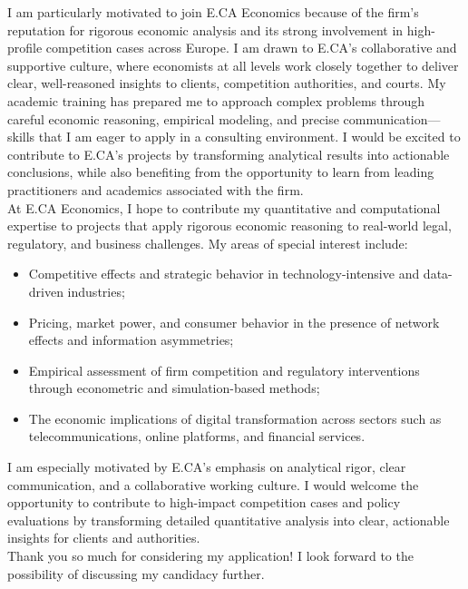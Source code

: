 \documentclass{nfr}
\begin{document}
I am particularly motivated to join E.CA Economics because of the firm’s reputation for rigorous economic analysis and its strong involvement in high-profile competition cases across Europe. 
I am drawn to E.CA’s collaborative and supportive culture, where economists at all levels work closely together to deliver clear, well-reasoned insights to clients, competition authorities, and courts. 
My academic training has prepared me to approach complex problems through careful economic reasoning, empirical modeling, and precise communication—skills that I am eager to apply in a consulting environment. 
I would be excited to contribute to E.CA’s projects by transforming analytical results into actionable conclusions, while also benefiting from the opportunity to learn from leading practitioners and academics associated with the firm.\\

At E.CA Economics, I hope to contribute my quantitative and computational expertise to projects that apply rigorous economic reasoning to real-world legal, regulatory, and business challenges. 
My areas of special interest include:
\begin{itemize}
    \item Competitive effects and strategic behavior in technology-intensive and data-driven industries;
    \item Pricing, market power, and consumer behavior in the presence of network effects and information asymmetries;
    \item Empirical assessment of firm competition and regulatory interventions through econometric and simulation-based methods;
    \item The economic implications of digital transformation across sectors such as telecommunications, online platforms, and financial services.
\end{itemize}

I am especially motivated by E.CA’s emphasis on analytical rigor, clear communication, and a collaborative working culture. 
I would welcome the opportunity to contribute to high-impact competition cases and policy evaluations by transforming detailed quantitative analysis into clear, actionable insights for clients and authorities.\\

Thank you so much for considering my application! I look forward to the possibility of discussing my candidacy further.
\vspace{10mm}
\end{document}
